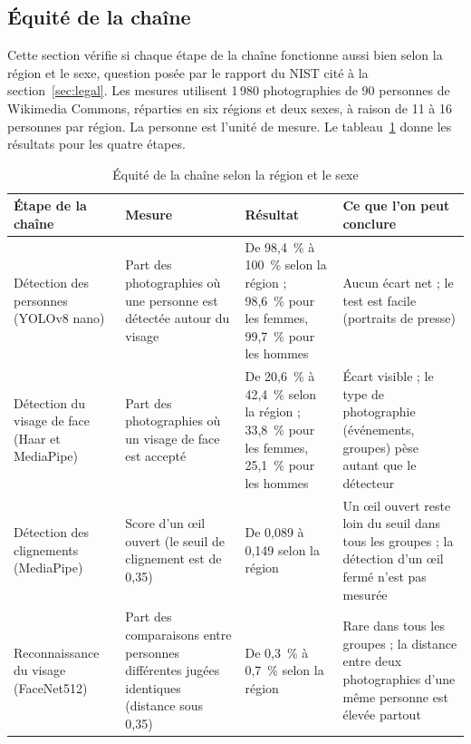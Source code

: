 \subsection{Équité de la chaîne}\label{sec:equite}

\begin{maj}
Cette section vérifie si chaque étape de la chaîne fonctionne aussi bien selon la région et le sexe, question posée par le rapport du NIST cité à la section~\ref{sec:legal}. Les mesures utilisent 1\,980 photographies de 90 personnes de Wikimedia Commons, réparties en six régions et deux sexes, à raison de 11 à 16 personnes par région. La personne est l'unité de mesure. Le tableau~\ref{tab:equite} donne les résultats pour les quatre étapes.
\end{maj}

\begin{table}[H]
\centering
\caption{Équité de la chaîne selon la région et le sexe\majmark}\label{tab:equite}
\small
\begin{tabularx}{\textwidth}{@{}>{\raggedright\arraybackslash}p{2.7cm}>{\raggedright\arraybackslash}p{3cm}>{\raggedright\arraybackslash}X>{\raggedright\arraybackslash}X@{}}
\toprule
\textbf{Étape de la chaîne} & \textbf{Mesure} & \textbf{Résultat} & \textbf{Ce que l'on peut conclure} \\
\midrule
Détection des personnes (YOLOv8 nano) & Part des photographies où une personne est détectée autour du visage & De 98,4~\% à 100~\% selon la région ; 98,6~\% pour les femmes, 99,7~\% pour les hommes & Aucun écart net ; le test est facile (portraits de presse) \\
Détection du visage de face (Haar et MediaPipe) & Part des photographies où un visage de face est accepté & De 20,6~\% à 42,4~\% selon la région ; 33,8~\% pour les femmes, 25,1~\% pour les hommes & Écart visible ; le type de photographie (événements, groupes) pèse autant que le détecteur \\
Détection des clignements (MediaPipe) & Score d'un œil ouvert (le seuil de clignement est de 0,35) & De 0,089 à 0,149 selon la région & Un œil ouvert reste loin du seuil dans tous les groupes ; la détection d'un œil fermé n'est pas mesurée \\
Reconnaissance du visage (FaceNet512) & Part des comparaisons entre personnes différentes jugées identiques (distance sous 0,35) & De 0,3~\% à 0,7~\% selon la région & Rare dans tous les groupes ; la distance entre deux photographies d'une même personne est élevée partout \\
\bottomrule
\end{tabularx}
\end{table}

